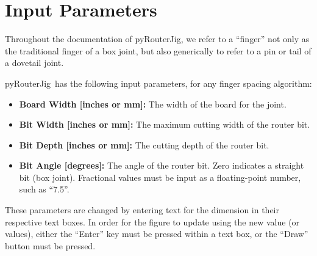 \documentclass[12pt,final]{article}
\newcommand{\codename}[0]{pyRouterJig}
\begin{document}
\section{Input Parameters}

Throughout the documentation of \codename, we refer to a ``finger'' not
only as the traditional finger of a box joint, but also generically to refer to a
pin or tail of a dovetail joint.

\codename~has the following input parameters, for any finger spacing
algorithm:
\begin{itemize}
\item \textbf{Board Width [inches or mm]:} The width of the board for the joint.
\item \textbf{Bit Width [inches or mm]:}  The maximum cutting width of the router bit.
\item \textbf{Bit Depth [inches or mm]:} The cutting depth of the router bit.
\item \textbf{Bit Angle [degrees]:} The angle of the router bit.  Zero indicates
  a straight bit (box joint).  Fractional values must be input as a
  floating-point number, such as ``7.5''.
\end{itemize}
These parameters are changed by entering text for the dimension in their
respective text boxes.  In order for the figure to update using the new value
(or values), either the ``Enter'' key must be pressed within a text box, or
the ``Draw'' button must be pressed.
\end{document}
